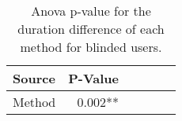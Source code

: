 
\begin{table}[!htb]
\centering
\caption{Anova p-value for the duration difference of each method for blinded users.}
\label{tab:blockedanova_duration_var}
\begin{tabular}{lrrrrr}
\toprule
Source & P-Value \\
\midrule
Method & 0.002** \\
\bottomrule
\end{tabular}
\end{table}

